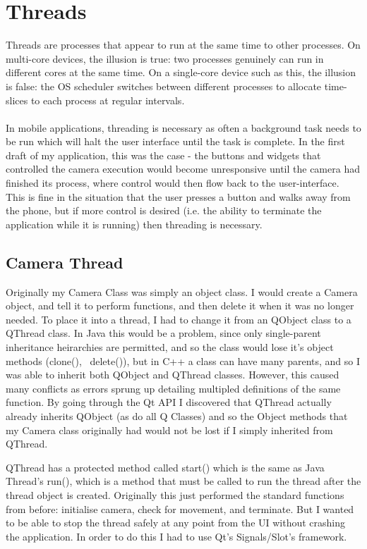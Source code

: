 \documentclass[11pt]{article} %
\begin{document}
\section{Threads}
Threads are processes that appear to run at the same time to other processes. On multi-core devices, the illusion is true: two processes genuinely can run in different cores at the same time. On a single-core device such as this, the illusion is false: the OS scheduler switches between different processes to allocate time-slices to each process at regular intervals.\\
\\In mobile applications, threading is necessary as often a background task needs to be run which will halt the user interface until the task is complete. In the first draft of my application, this was the case - the buttons and widgets that controlled the camera execution would become unresponsive until the camera had finished its process, where control would then flow back to the user-interface.
\\This is fine in the situation that the user presses a button and walks away from the phone, but if more control is desired (i.e. the ability to terminate the application while it is running) then threading is necessary.

\subsection{Camera Thread}
Originally my Camera Class was simply an object class. I would create a Camera object, and tell it to perform functions, and then delete it when it was no longer needed. To place it into a thread, I had to change it from an QObject class to a QThread class. In Java this would be a problem, since only single-parent inheritance heirarchies are permitted, and so the class would lose it's object methods (clone(), ~delete()), but in C++ a class can have many parents, and so I was able to inherit both QObject and QThread classes.
However, this caused many conflicts as errors sprung up detailing multipled definitions of the same function. By going through the Qt API I discovered that QThread actually already inherits QObject (as do all Q Classes) and so the Object methods that my Camera class originally had would not be lost if I simply inherited from QThread.

QThread has a protected method called start() which is the same as Java Thread's run(), which is a method that must be called to run the thread after the thread object is created. Originally this just performed the standard functions from before:  initialise camera, check for movement, and terminate. But I wanted to be able to stop the thread safely at any point from the UI without crashing the application. In order to do this I had to use Qt's Signals/Slot's framework.
\end{document}
